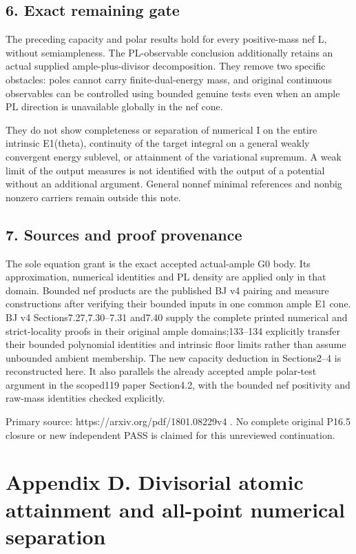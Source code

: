 \documentclass[
  10pt,
]{article}
\begin{document}
\subsection{6. Exact remaining gate}\label{exact-remaining-gate}

The preceding capacity and polar results hold for every positive-mass
nef L, without semiampleness. The PL-observable conclusion additionally
retains an actual supplied ample-plus-divisor decomposition. They remove
two specific obstacles: poles cannot carry finite-dual-energy mass, and
original continuous observables can be controlled using bounded genuine
tests even when an ample PL direction is unavailable globally in the nef
cone.

They do not show completeness or separation of numerical I on the entire
intrinsic E1(theta), continuity of the target integral on a general
weakly convergent energy sublevel, or attainment of the variational
supremum. A weak limit of the output measures is not identified with the
output of a potential without an additional argument. General nonnef
minimal references and nonbig nonzero carriers remain outside this note.

\subsection{7. Sources and proof
provenance}\label{sources-and-proof-provenance}

The sole equation grant is the exact accepted actual-ample G0 body. Its
approximation, numerical identities and PL density are applied only in
that domain. Bounded nef products are the published BJ v4 pairing and
measure constructions after verifying their bounded inputs in one common
ample E1 cone. BJ v4 Sections7.27,7.30--7.31 and7.40 supply the complete
printed numerical and strict-locality proofs in their original ample
domains;133--134 explicitly transfer their bounded polynomial identities
and intrinsic floor limits rather than assume unbounded ambient
membership. The new capacity deduction in Sections2--4 is reconstructed
here. It also parallels the already accepted ample polar-test argument
in the scoped119 paper Section4.2, with the bounded nef positivity and
raw-mass identities checked explicitly.

Primary source: https://arxiv.org/pdf/1801.08229v4 . No complete
original P16.5 closure or new independent PASS is claimed for this
unreviewed continuation.

\section{Appendix D. Divisorial atomic attainment and all-point
numerical
separation}\label{appendix-d.-divisorial-atomic-attainment-and-all-point-numerical-separation}
\end{document}
